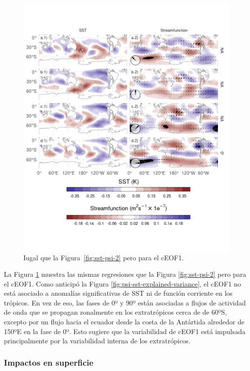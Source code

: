 \documentclass[12pt,oneside]{reedthesis}
\begin{document}
\begin{figure}
\includegraphics{figures/20-ceofs/sst-psi-1-1} \caption{Iugal que la Figura~\ref{fig:sst-psi-2} pero para el cEOF1.}\label{fig:sst-psi-1}
\end{figure}

La Figura \ref{fig:sst-psi-1} muestra las mismas regresiones que la Figura \ref{fig:sst-psi-2} pero para el cEOF1.
Como anticipó la Figura \ref{fig:psi-sst-explained-variance}, el cEOF1 no está asociado a anomalías significativas de SST ni de función corriente en los trópicos.
En vez de eso, las fases de 0º y 90º están asociadas a flujos de actividad de onda que se propagan zonalmente en los extratrópicos cerca de de 60ºS, excepto por un flujo hacia el ecuador desde la costa de la Antártida alrededor de 150ºE en la fase de 0º.
Esto sugiere que la variabilidad de cEOF1 está impulsada principalmente por la variabilidad interna de los extratrópicos.

\hypertarget{impactos-en-superficie}{%
\subsubsection{Impactos en superficie}\label{impactos-en-superficie}}
\end{document}
